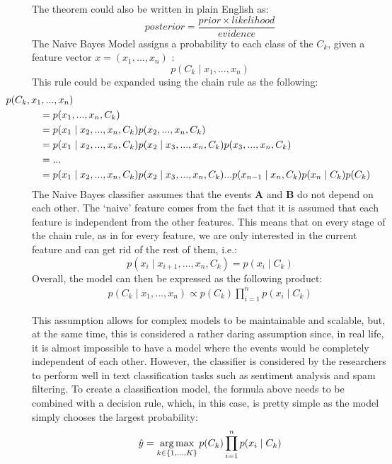     The theorem could also be written in plain English as:
    $$ posterior = \frac{prior \times likelihood}{evidence} $$
    The Naive Bayes Model assigns a probability to each class of the $C_k$, given a feature vector $ x= (x_1, ..., x_n)$ :
    $$p(C_k \mid x_1, ..., x_n)$$
    This rule could be expanded using the chain rule as the following:
    \begin{align}
        \mathclap{p (C_k, x_1, ..., x_n)}  & \notag \\
    &= p(x_1, ..., x_n, C_k)  & \notag \\
    &= p(x_1 \mid x_2, ..., x_n, C_k)p(x_2, ..., x_n, C_k)  & \notag \\
    &= p(x_1 \mid x_2, ..., x_n, C_k)p(x_2 \mid x_3, ..., x_n, C_k)p(x_3, ..., x_n, C_k)  & \notag \\
    &= ...  & \notag \\
    &= p(x_1 \mid x_2, ..., x_n, C_k)p(x_2 \mid x_3, ..., x_n, C_k)...p(x_{n-1} \mid x_n, C_k)p(x_n \mid
    C_k)p(C_k)  & \notag \\
    \end{align}
    The Naive Bayes classifier assumes that the events \textbf{A} and \textbf{B} do not depend on each other.
    The `naive' feature comes from the fact that it is assumed that each feature is independent from the other features. This means that on every stage of the chain rule, as in for every feature, we are only interested in the current feature and can get rid of the rest of them, i.e.:
    $$ p(x_i \mid x_{i+1}, ..., x_n, C_k) = p(x_i \mid C_k) $$
    Overall, the model can then be expressed as the following product:
    \begin{align}
        p(C_k \mid x_1, ..., x_n) \propto p(C_k) \prod_{i=1}^{n} p(x_i \mid C_k)
    \end{align}
   
     This assumption allows for complex models to be maintainable and scalable, but, at the same time, this is considered a rather daring assumption since, in real life, it is almost impossible to have a model where the events would be completely independent of each other. However, the classifier is considered by the researchers to perform well in text classification tasks such as sentiment analysis and spam filtering.
     To create a classification model, the formula above needs to be combined with a decision rule, which, in this case, is pretty simple as the model simply chooses the largest probability:
     \begin{align}
         \hat{y} =  \operatorname*{arg\,max}_{k \in \{1,...,K\}} p(C_k) \prod_{i=1}^{n} p(x_i \mid C_k)
     \end{align}
     
